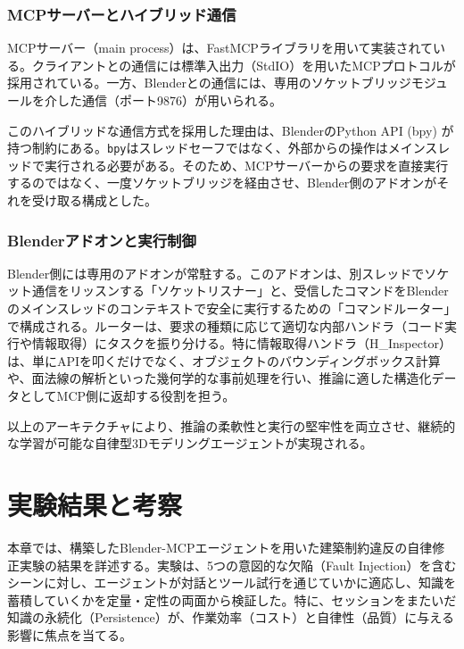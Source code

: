 \documentclass{deimj}
\begin{document}
\subsubsection{MCPサーバーとハイブリッド通信}

MCPサーバー（main process）は、FastMCPライブラリを用いて実装されている。クライアントとの通信には標準入出力（StdIO）を用いたMCPプロトコルが採用されている。一方、Blenderとの通信には、専用のソケットブリッジモジュールを介した通信（ポート9876）が用いられる。

このハイブリッドな通信方式を採用した理由は、BlenderのPython API (bpy) が持つ制約にある。\texttt{bpy}はスレッドセーフではなく、外部からの操作はメインスレッドで実行される必要がある。そのため、MCPサーバーからの要求を直接実行するのではなく、一度ソケットブリッジを経由させ、Blender側のアドオンがそれを受け取る構成とした。

\subsubsection{Blenderアドオンと実行制御}

Blender側には専用のアドオンが常駐する。このアドオンは、別スレッドでソケット通信をリッスンする「ソケットリスナー」と、受信したコマンドをBlenderのメインスレッドのコンテキストで安全に実行するための「コマンドルーター」で構成される。ルーターは、要求の種類に応じて適切な内部ハンドラ（コード実行や情報取得）にタスクを振り分ける。特に情報取得ハンドラ（H\_Inspector）は、単にAPIを叩くだけでなく、オブジェクトのバウンディングボックス計算や、面法線の解析といった幾何学的な事前処理を行い、推論に適した構造化データとしてMCP側に返却する役割を担う。

以上のアーキテクチャにより、推論の柔軟性と実行の堅牢性を両立させ、継続的な学習が可能な自律型3Dモデリングエージェントが実現される。

\section{実験結果と考察}

本章では、構築したBlender-MCPエージェントを用いた建築制約違反の自律修正実験の結果を詳述する。実験は、5つの意図的な欠陥（Fault Injection）を含むシーンに対し、エージェントが対話とツール試行を通じていかに適応し、知識を蓄積していくかを定量・定性の両面から検証した。特に、セッションをまたいだ知識の永続化（Persistence）が、作業効率（コスト）と自律性（品質）に与える影響に焦点を当てる。
\end{document}
